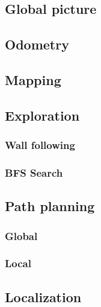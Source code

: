\subsection{Global picture}
\subsection{Odometry}
\subsection{Mapping}
\subsection{Exploration}
\subsubsection{Wall following}
\subsubsection{BFS Search}
\subsection{Path planning}
\subsubsection{Global}
\subsubsection{Local}
\subsection{Localization}
